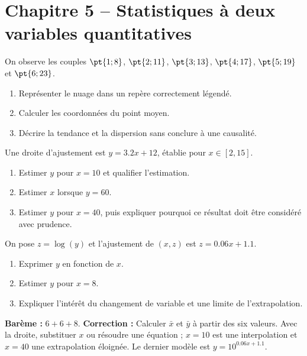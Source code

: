 \section*{Chapitre 5 -- Statistiques à deux variables quantitatives}
\begin{exercise}
On observe les couples $\pt{1;8}$, $\pt{2;11}$, $\pt{3;13}$, $\pt{4;17}$, $\pt{5;19}$ et $\pt{6;23}$.
\begin{enumerate}
\item Représenter le nuage dans un repère correctement légendé.
\item Calculer les coordonnées du point moyen.
\item Décrire la tendance et la dispersion sans conclure à une causalité.
\end{enumerate}
\end{exercise}
\begin{exercise}
Une droite d'ajustement est $y=\num{3,2}x+12$, établie pour $x\in[2,15]$.
\begin{enumerate}
\item Estimer $y$ pour $x=10$ et qualifier l'estimation.
\item Estimer $x$ lorsque $y=60$.
\item Estimer $y$ pour $x=40$, puis expliquer pourquoi ce résultat doit être considéré avec prudence.
\end{enumerate}
\end{exercise}
\begin{exercise}
On pose $z=\log(y)$ et l'ajustement de $(x,z)$ est $z=\num{0,06}x+\num{1,1}$.
\begin{enumerate}
\item Exprimer $y$ en fonction de $x$.
\item Estimer $y$ pour $x=8$.
\item Expliquer l'intérêt du changement de variable et une limite de l'extrapolation.
\end{enumerate}
\end{exercise}
\begin{solution}\textbf{Barème :} $6+6+8$. \textbf{Correction :} Calculer $\bar x$ et $\bar y$ à partir des six valeurs. Avec la droite, substituer $x$ ou résoudre une équation ; $x=10$ est une interpolation et $x=40$ une extrapolation éloignée. Le dernier modèle est $y=10^{\num{0,06}x+\num{1,1}}$.\end{solution}

